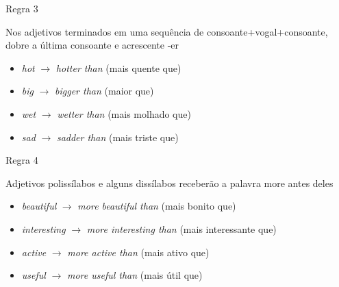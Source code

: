 \documentclass[compress,mathserif]{beamer}
\begin{document}

\begin{frame}{Regra 3}

Nos adjetivos terminados em uma sequência de consoante+vogal+consoante, dobre a última consoante e acrescente -er

\vspace{0.5cm}

\begin{itemize}
    \item \textit{hot} $\rightarrow$ \textit{hotter than} (mais quente que)
    \item \textit{big} $\rightarrow$ \textit{bigger than} (maior que)
    \item \textit{wet} $\rightarrow$ \textit{wetter than} (mais molhado que)
    \item \textit{sad} $\rightarrow$ \textit{sadder than} (mais triste que)
\end{itemize}

\end{frame}


\begin{frame}{Regra 4}

Adjetivos polissílabos e alguns dissílabos receberão a palavra more antes deles

\vspace{0.5cm}

\begin{itemize}
    \item \textit{beautiful} $\rightarrow$ \textit{more beautiful than} (mais bonito que)
    \item \textit{interesting} $\rightarrow$ \textit{more interesting than} (mais interessante que)
    \item \textit{active} $\rightarrow$ \textit{more active than} (mais ativo que)
    \item \textit{useful} $\rightarrow$ \textit{more useful than} (mais útil que)
\end{itemize}

\end{frame}

\end{document}
